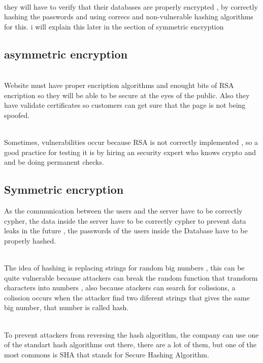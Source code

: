 \documentclass[10pt,a4paper]{article} %
\begin{document}
        \\they will have to verify that their databases are properly encrypted
        , by correctly hashing the passwords and using correcs and
        non-vulnerable hashing algorithms for this. i will explain this later
        in the section of symmetric encryption

        \subsection{asymmetric encryption}

            \\ Website must have proper encription algorithms and enought bits of
            RSA encription so they will be able to be secure at the eyes of the
            public. Also they have validate certificates so customers can get sure
            that the page is not being spoofed.

            \\ Sometimes, vulnerabilities occur because RSA is not correctly
            implemented , so a good practice for testing it is by hiring an
            security expert who knows crypto and and be doing permanent checks.

        \subsection{Symmetric encryption}

            As the communication between the users and the server have to be
            correctly cypher, the data inside the server have to be correctly
            cypher to prevent data leaks in the future , the passwords of the
            users inside the Database have to be properly hashed. 

            \\ The idea of hashing is replacing strings for random big numbers
            , this can be quite vulnerable because attackers can break the
            random function that transform characters into numbers , also
            because atackers can search for colissions, a colission occurs when
            the attacker find two diferent strings that gives the same big
            number, that number is called hash. 
            
            \\ To prevent attackers from reversing the hash algorithm, the
            company can use one of the standart hash algorithms out there,
            there are a lot of them, but one of the most commons is SHA that
            stands for Secure Hashing Algorithm.
            
\end{document}
